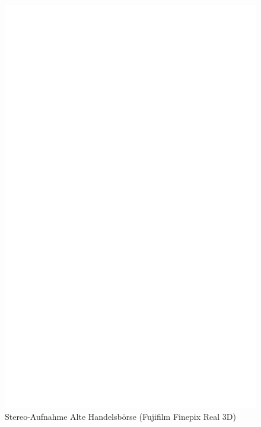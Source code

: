 \documentclass[liststotoc,bibtotoc,fontsize=14pt,]{scrreprt}
\begin{document}
	 \newpage
	 \begin{figure}[h]
 	 	\includegraphics[width=\linewidth]{img/ph.jpg}
 	 	\caption{Stereo-Aufnahme Alte Handelsbörse (Fujifilm Finepix Real 3D)}
	 \end{figure}

	
\end{document}

